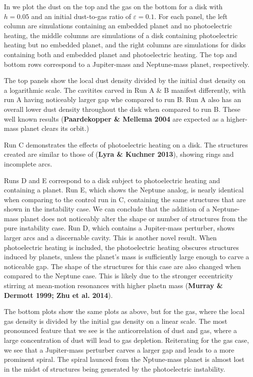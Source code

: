 \documentclass[onecolumn]{report}
\newcommand{\epsi}{\varepsilon}
\begin{document}
\begin{figure}
  \label{fig:eps01dustgas}
\end{figure}

In  we plot the dust on the top and the gas on the bottom for a disk with $h=0.05$ and an initial dust-to-gas ratio of $\epsi=0.1$. For each panel, the left column are simulations containing an embedded planet and no photoelectric heating, the middle columns are simulations of a disk containing photoelectric heating but no embedded planet, and the right columns are simulations for disks containing both and embedded planet and photoelectric heating. The top and bottom rows correspond to a Jupiter-mass and Neptune-mass planet, respectively.

The top panels show the local dust density divided by the initial dust density on a logarithmic scale. The cavitites carved in Run A \& B manifest differently, with run A having noticeably larger gap whe compared to run B. Run A also has an overall lower dust density throughout the disk when compared to run B. These well known results (\textbf{Paardekopper \& Mellema 2004} are expected as a higher-mass planet clears its orbit.)

Run C demonstrates the effects of photoelectric heating on a disk. The structures created are similar to those of (\textbf{Lyra \& Kuchner 2013}), showing rings and incomplete arcs.

Runs D and E correspond to a disk subject to photoelectric heating and containing a planet. Run E, which shows the Neptune analog, is nearly identical when comparing to the control run in C, containing the same structures that are shown in the instability case. We can conclude that the addition of a Neptune-mass planet does not noticeably alter the shape or number of structures from the pure instability case. Run D, which contains a Jupiter-mass perturber, shows larger arcs and a discernable cavity. This is another novel result. When photoelectric heating is included, the photoelectric heating obscures structures induced by planets, unless the planet's mass is sufficiently large enough to carve a noticeable gap. The shape of the structures for this case are also changed when compared to the Neptune case. This is likely due to the stronger eccentricity stirring at mean-motion resonances with higher plaetn mass (\textbf{Murray \& Dermott 1999; Zhu et al. 2014}).

The bottom plots show the same plots as above, but for the gas, where the local gas density is divided by the initial gas density on a linear scale. The most pronounced feature that we see is the anticorrelation of dust and gas, where a large concentration of dust will lead to gas depletion. Reiterating for the gas case, we see that a Jupiter-mass perturber carves a larger gap and leads to a more prominent spiral. The spiral launced from the Nptune-mass planet is almost lost in the midst of structures being generated by the photoelectric instability.
\end{document}
